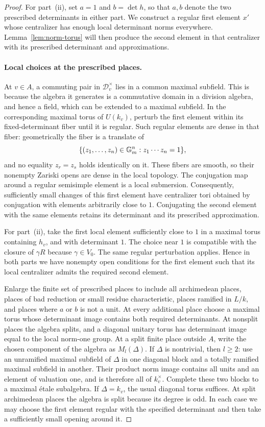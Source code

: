 \begin{proof}
For part~\textup{(ii)}, set $a=1$ and $b=\det h$, so that $a,b$ denote
the two prescribed determinants in either part.
We construct a regular first element $x'$ whose centralizer has enough
local determinant norms everywhere.  Lemma~\ref{lem:norm-torus} will
then produce the second element in that centralizer with its prescribed
determinant and approximations.

\paragraph{Local choices at the prescribed places.}
At $v\in A$, a commuting pair in $\mathcal D_v^\times$ lies in a common
maximal subfield.  This is because the algebra it generates is a
commutative domain in a division algebra, and hence a field, which can
be extended to a maximal subfield.  In the corresponding maximal torus
of $U(k_v)$, perturb the first element within its fixed-determinant
fiber until it is regular.  Such regular elements are dense in that
fiber: geometrically the fiber is a translate of
\[
 \{(z_1,\ldots,z_n)\in\mathbb G_m^n:z_1\cdots z_n=1\},
\]
and no equality $z_r=z_s$ holds identically on it.  These fibers are
smooth, so their nonempty Zariski opens are dense in the local topology.
The conjugation map around a regular semisimple element is a local
submersion.  Consequently, sufficiently small changes of this first
element have centralizer tori obtained by conjugation with elements
arbitrarily close to $1$.  Conjugating the second element with the same
elements retains its determinant and its prescribed approximation.

For part~\textup{(ii)}, take the first local element sufficiently close
to $1$ in a maximal torus containing $h_v$, and with determinant $1$.
The choice near $1$ is compatible with the closure of $\gamma R$ because
$\gamma\in V_0$.  The same regular perturbation applies.  Hence in both
parts we have nonempty open conditions for the first element such that
its local centralizer admits the required second element.

Enlarge the finite set of prescribed places to include all archimedean
places, places of bad reduction or small residue characteristic, places
ramified in $L/k$, and places where $a$ or $b$ is not a unit.  At every
additional place choose a maximal torus whose determinant image contains
both required determinants.  At nonsplit places the algebra splits, and
a diagonal unitary torus has determinant image equal to the local
norm-one group.  At a split finite place outside $A$, write the chosen
component of the algebra as $M_l(\Delta)$.  If $\Delta$ is nontrivial,
then $l\geq2$: use an unramified maximal subfield of $\Delta$ in one
diagonal block and a totally ramified maximal subfield in another.
Their product norm image contains all units and an element of valuation
one, and is therefore all of $k_v^\times$.  Complete these two blocks
to a maximal \'etale subalgebra.  If $\Delta=k_v$, the usual diagonal
torus suffices.  At split archimedean places the algebra is split because
its degree is odd.  In each case we may choose the first element regular
with the specified determinant and then take a sufficiently small
opening around it.


\end{proof}
